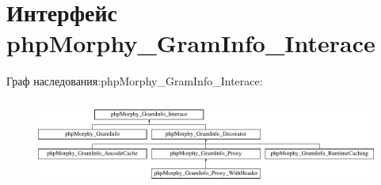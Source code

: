 \hypertarget{interfacephpMorphy__GramInfo__Interace}{
\section{Интерфейс phpMorphy\_\-GramInfo\_\-Interace}
\label{interfacephpMorphy__GramInfo__Interace}
}
Граф наследования:phpMorphy\_\-GramInfo\_\-Interace:\begin{figure}[H]
\begin{center}
\leavevmode
\includegraphics[height=2.916667cm]{interfacephpMorphy__GramInfo__Interace}
\end{center}
\end{figure}
